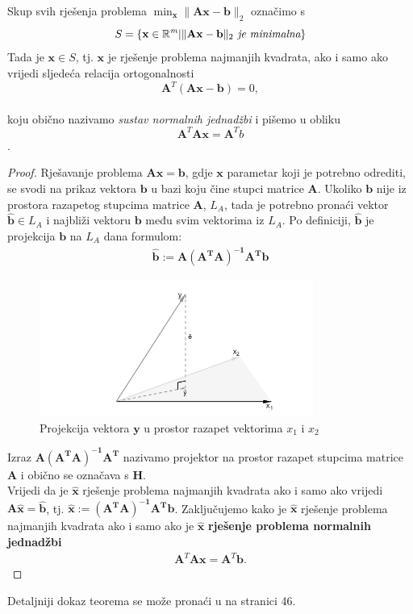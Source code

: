\documentclass[a4paper,twoside,12pt]{memoir} %
\begin{document}
\begin{thm}\label{thm:1}
	Skup svih rješenja problema $\min_\mathbf{x}\| \mathbf{A}\mathbf{x} - \mathbf{b} \|_2$ označimo s
	$$ S= \{\mathbf{x} \in \mathbb{R}^\mathit{m} | \| \mathbf{A}\mathbf{x} - \mathbf{b} \|_2 \textit{ je minimalna} \} $$
	Tada je $\mathbf{x}  \in S$, tj. $\mathbf{x}$ je rješenje problema najmanjih kvadrata, ako i samo ako vrijedi sljedeća relacija ortogonalnosti 
	$$\mathbf{A}^T(\mathbf{A}\mathbf{x}-\mathbf{b}) = 0,$$
	\\ koju obično nazivamo \textit{sustav normalnih jednadžbi} i pišemo u obliku 
	$$ \mathbf{A}^T\mathbf{A}\mathbf{x} = \mathbf{A}^Tb $$.
	\end{thm}
	\begin{proof}
		Rješavanje problema $\mathbf{A}\mathbf{x} = \mathbf{b}$, gdje $\mathbf{x}$ parametar koji je potrebno odrediti, se svodi na prikaz vektora $\mathbf{b}$ u bazi koju čine stupci matrice $\mathbf{A}$. Ukoliko $\mathbf{b}$ nije iz prostora razapetog stupcima matrice $\mathbf{A}$, $L_A$,
		tada je potrebno pronaći vektor $\mathbf{\hat{b}} \in L_A$ i
		najbliži vektoru $\mathbf{b}$ među svim vektorima iz $L_A$.
		Po definiciji, $\mathbf{\hat{b}}$ je projekcija $\mathbf{b}$ na $L_A$ dana formulom:
		\begin{align*}
		\mathbf{\hat{b}} := \mathbf{A(A^TA)^{-1}A^T}\mathbf{b}
		\end{align*}
		\begin{figure}[H]
			\centering
			\includegraphics[width=0.8\textwidth]{linProjection}
			\caption{Projekcija vektora $\mathbf{y}$ u prostor razapet vektorima $x_1$ i $x_2$ \cite{svd_str15} }
			\label{Fig:projection}	
			\end{figure}
			
			Izraz $\mathbf{A(A^TA)^{-1}A^T}$ nazivamo projektor na prostor razapet stupcima matrice $\mathbf{A}$ i obično se označava s $\mathbf{H}$.\\
			Vrijedi da je $\mathbf{\hat{x}}$ rješenje problema najmanjih kvadrata ako i samo ako
			vrijedi $\mathbf{A}\mathbf{\hat{x}} = \mathbf{\hat{b}}$, tj.
			$\mathbf{\hat{x}}:= \mathbf{(A^TA)^{-1}A^T}\mathbf{b}$\label{eq:lin1Xeq}. Zaključujemo kako je $\mathbf{\hat{x}}$ rješenje problema najmanjih kvadrata ako i samo ako je $\mathbf{\hat{x}}$ \textbf{rješenje problema normalnih jednadžbi}
			\begin{align}\label{eq:sustavProj}
			\mathbf{A}^T\mathbf{A}\mathbf{x} = \mathbf{A}^T\mathbf{b}.
			\end{align}
			\end{proof}
Detaljniji dokaz teorema se može pronaći u \cite{singer07} na stranici 46.\\
\end{document}
